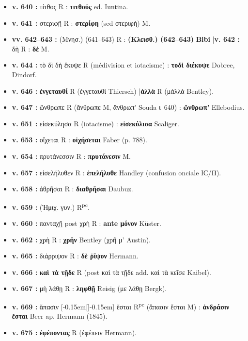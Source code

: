 \documentclass[10pt, a4paper, twoside]{book}
\renewcommand{\_}{\origunderscore\penalty0\relax}
\providecommand{\lecon}[1]{\textbf{#1}}
\providecommand{\expo}[1]{\textsuperscript{#1}}
\providecommand{\Rpc}{R\expo{pc}}
\providecommand{\Mon}{M}
\providecommand{\espApp}{\hspace{0.5em}|\hspace{0.5em}}
\providecommand{\inRas}[2]{[\kern-0.15em[\text{#1}]\kern-0.15em]\text{#2}}
\begin{document}
\begin{itemize}
\begin{itemize}
    \item \textbf{v. 640 :} τίτθος R : \lecon{τιτθούς} ed. Iuntina.
    \item \textbf{v. 641 :} στεριφῇ R : \lecon{στερίφη} (sed στεριφὴ) \Mon{}.
    \item \textbf{vv. 642–643 :} (Μνησ.) (641–643) R : \lecon{(Κλεισθ.) (642–643)} \lecon{Bibi} \espApp \textbf{v. 642 :} δὴ R : \lecon{δὲ} \Mon{}.
    \item \textbf{v. 644 :} τὸ δὶ δὴ ἔκυψε R (médivision et iotacisme) : \lecon{τοδὶ διέκυψε} Dobree, Dindorf.
    \item \textbf{v. 646 :} \lecon{ἐνγεταυθί} R (ἐγγεταυθί Thiersch) \espApp \lecon{ἀλλὰ} R (μἀλλὰ Bentley).
    \item \textbf{v. 647 :} ῶνθρωπε R (ἄνθρωπε \Mon{}, ἄνθρωπ' Souda ι~640) : \lecon{ὤνθρωπ'} Ellebodius.
    \item \textbf{v. 651 :} εἰσεκύλησα R (iotacisme) : \lecon{εἰσεκύλισα} Scaliger.
    \item \textbf{v. 653 :} οἴχεται R : \lecon{οἰχήσεται} Faber (p. 788).
    \item \textbf{v. 654 :} πρυτάνεσσιν R : \lecon{πρυτάνεσιν} \Mon{}.
    \item \textbf{v. 657 :} εἰσελήλυθεν R : \lecon{ἐπελήλυθε} Handley (confusion onciale ΙϹ/Π).
    \item \textbf{v. 658 :} ἀθρῆσαι R : \lecon{διαθρῆσαι} Daubuz.
    \item \textbf{v. 659 :} (Ἡμιχ. γυν.) \Rpc{}.
    \item \textbf{v. 660 :} πανταχῇ post χρὴ R : \lecon{ante μόνον} Küster.
    \item \textbf{v. 662 :} χρὴ R : \lecon{χρῆν} Bentley (χρῆ μ' Austin).
    \item \textbf{v. 665 :} διάρριψον R : \lecon{δὲ ῥῖψον} Hermann.
    \item \textbf{v. 666 :} \lecon{καὶ τὰ τῇδε} R (post καὶ τὰ τῇδε add. καὶ τὰ κεῖσε Kaibel).
    \item \textbf{v. 667 :} μὴ λάθῃ R : \lecon{ληφθῇ} Reisig (με λάθῃ Bergk).
    \item \textbf{v. 669 :} ἅπασιν \inRas{ἅπασιν}{} ἔσται \Rpc{} (ἅπασιν ἔσται \Mon{}) : \lecon{ἀνδράσιν ἔσται} Beer ap. Hermann (1845).
    \item \textbf{v. 675 :} \lecon{ἐφέποντας} R (ἐφέπειν Hermann).
  \end{itemize}
\end{itemize}
\end{document}
